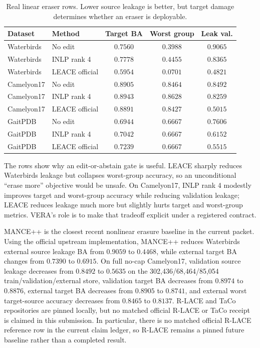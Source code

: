 \documentclass[letterpaper]{article}
\begin{document}
\begin{table}[t]
\centering
\small
\caption{Real linear eraser rows. Lower source leakage is better, but target
damage determines whether an eraser is deployable.}
\label{tab:linear-erasers}
\begin{tabular}{@{}llccc@{}}
\toprule
Dataset & Method & Target BA & Worst group & Leak val. \\
\midrule
Waterbirds & No edit & $0.7560$ & $0.3988$ & $0.9065$ \\
Waterbirds & INLP rank 4 & $0.7778$ & $0.4455$ & $0.8365$ \\
Waterbirds & LEACE official & $0.5954$ & $0.0701$ & $0.4821$ \\
Camelyon17 & No edit & $0.8905$ & $0.8464$ & $0.8492$ \\
Camelyon17 & INLP rank 4 & $0.8943$ & $0.8628$ & $0.8259$ \\
Camelyon17 & LEACE official & $0.8891$ & $0.8427$ & $0.5015$ \\
GaitPDB & No edit & $0.6944$ & $0.6667$ & $0.7606$ \\
GaitPDB & INLP rank 4 & $0.7042$ & $0.6667$ & $0.6152$ \\
GaitPDB & LEACE official & $0.7239$ & $0.6667$ & $0.5515$ \\
\bottomrule
\end{tabular}
\end{table}

The rows show why an edit-or-abstain gate is useful. LEACE sharply reduces
Waterbirds leakage but collapses worst-group accuracy, so an unconditional
``erase more'' objective would be unsafe. On Camelyon17, INLP rank 4 modestly
improves target and worst-group accuracy while reducing validation leakage;
LEACE reduces leakage much more but slightly hurts target and worst-group
metrics. VERA's role is to make that tradeoff explicit under a registered
contract.

MANCE++ is the closest recent nonlinear erasure baseline in the current packet.
Using the official upstream implementation, MANCE++ reduces Waterbirds external
source leakage BA from $0.9059$ to $0.4468$, while external target BA changes
from $0.7390$ to $0.6915$. On full no-cap Camelyon17, validation source
leakage decreases from $0.8492$ to $0.5635$ on the
302,436/68,464/85,054 train/validation/external store, validation target BA
decreases from $0.8974$ to $0.8876$, external target BA decreases from
$0.8905$ to $0.8741$, and external worst target-source accuracy decreases from
$0.8465$ to $0.8137$. R-LACE and TaCo repositories are pinned locally, but no
matched official R-LACE or TaCo receipt is claimed in this submission. In
particular, there is no matched official R-LACE reference row in the current
claim ledger, so R-LACE remains a pinned future baseline rather than a
completed result.
\end{document}
